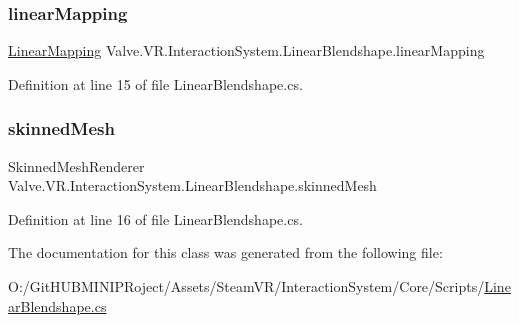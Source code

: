 \subsubsection{\texorpdfstring{linearMapping}{linearMapping}}
{\footnotesize\ttfamily \mbox{\hyperlink{class_valve_1_1_v_r_1_1_interaction_system_1_1_linear_mapping}{Linear\+Mapping}} Valve.\+V\+R.\+Interaction\+System.\+Linear\+Blendshape.\+linear\+Mapping}



Definition at line 15 of file Linear\+Blendshape.\+cs.

\mbox{\label{class_valve_1_1_v_r_1_1_interaction_system_1_1_linear_blendshape_a0e9a4a8134d5de1e2817eef0622607e6}} 
\subsubsection{\texorpdfstring{skinnedMesh}{skinnedMesh}}
{\footnotesize\ttfamily Skinned\+Mesh\+Renderer Valve.\+V\+R.\+Interaction\+System.\+Linear\+Blendshape.\+skinned\+Mesh}



Definition at line 16 of file Linear\+Blendshape.\+cs.



The documentation for this class was generated from the following file\+:\begin{DoxyCompactItemize}
\item 
O\+:/\+Git\+H\+U\+B\+M\+I\+N\+I\+P\+Roject/\+Assets/\+Steam\+V\+R/\+Interaction\+System/\+Core/\+Scripts/\mbox{\hyperlink{_linear_blendshape_8cs}{Linear\+Blendshape.\+cs}}\end{DoxyCompactItemize}

